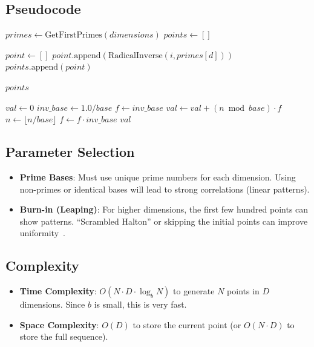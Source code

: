 \subsection{Pseudocode}
\begin{algorithm}
\caption{Halton Sequence Generator}\label{alg:halton_sequence}
\begin{algorithmic}
    \State $primes \gets \text{GetFirstPrimes}(dimensions)$
    \State $points \gets []$

        \State $point \gets []$
            \State $point.\text{append}(\text{RadicalInverse}(i, primes[d]))$
        \EndFor
        \State $points.\text{append}(point)$
    \EndFor

    \Return $points$
\EndFunction

\Statex

    \State $val \gets 0$
    \State $inv\_base \gets 1.0 / base$
    \State $f \gets inv\_base$
        \State $val \gets val + (n \bmod base) \cdot f$
        \State $n \gets \lfloor n / base \rfloor$
        \State $f \gets f \cdot inv\_base$
    \EndWhile
    \Return $val$
\EndFunction
\end{algorithmic}
\end{algorithm}

\subsection{Parameter Selection}
\begin{itemize}
    \item \textbf{Prime Bases}: Must use unique prime numbers for each dimension. Using non-primes or identical bases will lead to strong correlations (linear patterns).
    \item \textbf{Burn-in (Leaping)}: For higher dimensions, the first few hundred points can show patterns. ``Scrambled Halton'' or skipping the initial points can improve uniformity~\cite{niederreiter1992}.
\end{itemize}

\subsection{Complexity}
\begin{itemize}
    \item \textbf{Time Complexity}: $O(N \cdot D \cdot \log_b N)$ to generate $N$ points in $D$ dimensions. Since $b$ is small, this is very fast.
    \item \textbf{Space Complexity}: $O(D)$ to store the current point (or $O(N \cdot D)$ to store the full sequence).
\end{itemize}

